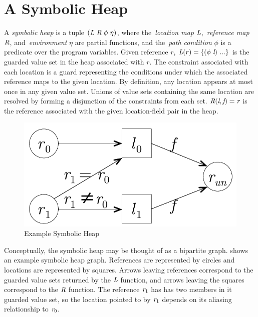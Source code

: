 \section{A Symbolic Heap}
A \emph{symbolic heap} is a tuple
$(\emph{L}\ \emph{R}\ \phi\ \eta)$, where the~\emph{location map}
$\emph{L}$,~\emph{reference map} $\emph{R}$, and~\emph{environment}
$\eta$ are partial functions, and the~\emph{path condition} $\phi$ is
a predicate over the program variables. Given reference $r$,
$\cfgnt{L}(r) = \{(\phi\ \cfgnt{l})\ ...\}$ is the guarded value set
in the heap associated with $r$. The constraint associated with each
location is a guard representing the conditions under which the
associated reference maps to the given location. By definition, any
location appears at most once in any given value set. Unions of value
sets containing the same location are resolved by forming a
disjunction of the constraints from each set. $\emph{R}(\emph{l},
\emph{f}) = \emph{r}$ is the reference associated with the given
location-field pair in the heap. 

\begin{figure}[t]
\begin{center}
\includegraphics[scale=0.5]{../figs/simple_heap_scratch.pdf}
\end{center}
\caption{Example Symbolic Heap}
\label{fig:exampleHeap}
\end{figure}

Conceptually, the symbolic heap may be thought of as a bipartite
graph.  shows an example symbolic heap
graph. References are represented by circles and locations are
represented by squares. Arrows leaving references correspond to the
guarded value sets returned by the $\emph{L}$ function, and arrows
leaving the squares correspond to the $\emph{R}$ function. The
reference $\emph{r}_1$ has has two members in it guarded value set,
so the location pointed to by $\emph{r}_1$ depends on its aliasing
relationship to $\emph{r}_0$.

